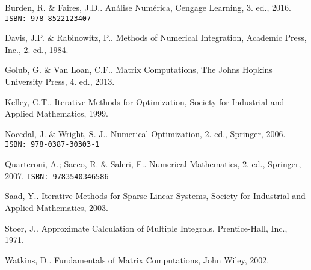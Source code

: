 \documentclass[12pt]{book}
\begin{document}
\begin{thebibliography}{99}
  
    Burden, R. \& Faires, J.D.. Análise Numérica, Cengage Learning, 3. ed., 2016. \texttt{ISBN: 978-8522123407}

    Davis, J.P. \& Rabinowitz, P.. Methods of Numerical Integration, Academic Press, Inc., 2. ed., 1984.

    Golub, G. \& Van Loan, C.F.. Matrix Computations, The Johns Hopkins University Press, 4. ed., 2013.

    Kelley, C.T.. Iterative Methods for Optimization, Society for Industrial and Applied Mathematics, 1999.
  
    Nocedal, J. \& Wright, S. J.. Numerical Optimization, 2. ed., Springer, 2006. \texttt{ISBN: 978-0387-30303-1}

    Quarteroni, A.; Sacco, R. \& Saleri, F.. Numerical Mathematics, 2. ed., Springer, 2007. \texttt{ISBN: 9783540346586}

    Saad, Y.. Iterative Methods for Sparse Linear Systems, Society for Industrial and Applied Mathematics, 2003.

    Stoer, J.. Approximate Calculation of Multiple Integrals, Prentice-Hall, Inc., 1971.

    Watkins, D.. Fundamentals of Matrix Computations, John Wiley, 2002.
      
\end{thebibliography}

\ifisbook
\printindex
\fi
  
\end{document}
